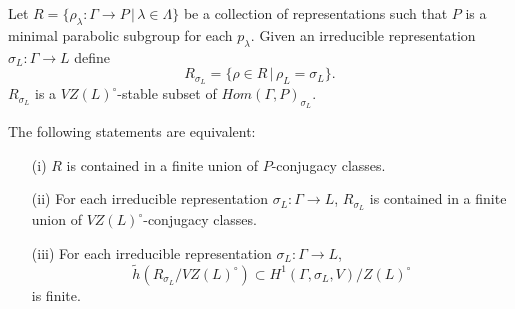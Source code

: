 \begin{lemma}
  Let $R = \{\rho_\lambda:\Gamma\rightarrow P\,|\,\lambda\in\Lambda\}$ be a collection of representations such that $P$ is a minimal parabolic subgroup for each $p_\lambda$. Given an irreducible representation $\sigma_L:\Gamma\rightarrow L$ define
  \begin{displaymath}
    R_{\sigma_L} = \{\rho \in R\,|\,\rho_L = \sigma_L\}. 
  \end{displaymath}
  $R_{\sigma_L}$ is a $VZ(L)^\circ$-stable subset of $Hom(\Gamma, P)_{\sigma_L}$.
  
  The following statements are equivalent:
  \begin{itemize}
    \item[(i)] $R$ is contained in a finite union of $P$-conjugacy classes.
    \item[(ii)] For each irreducible representation $\sigma_L:\Gamma\rightarrow L$, $R_{\sigma_L}$ is contained in a finite union of $VZ(L)^\circ$-conjugacy classes.
    \item[(iii)] For each irreducible representation $\sigma_L:\Gamma\rightarrow L$,
      \begin{displaymath}
	\tilde{h}(R_{\sigma_L}/VZ(L)^\circ) \subset H^{1}(\Gamma,\sigma_L,V)/Z(L)^\circ
      \end{displaymath}
      is finite.
  \end{itemize}
  \label{lem:p_h1}
\end{lemma}

